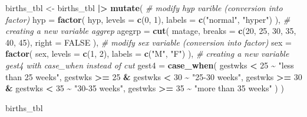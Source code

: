 \documentclass[
]{book}
\newenvironment{Shaded}{\begin{snugshade}}{\end{snugshade}}
\newcommand{\AttributeTok}[1]{\textcolor[rgb]{0.13,0.29,0.53}{#1}}
\newcommand{\CommentTok}[1]{\textcolor[rgb]{0.56,0.35,0.01}{\textit{#1}}}
\newcommand{\ConstantTok}[1]{\textcolor[rgb]{0.56,0.35,0.01}{#1}}
\newcommand{\DecValTok}[1]{\textcolor[rgb]{0.00,0.00,0.81}{#1}}
\newcommand{\FunctionTok}[1]{\textcolor[rgb]{0.13,0.29,0.53}{\textbf{#1}}}
\newcommand{\NormalTok}[1]{#1}
\newcommand{\OtherTok}[1]{\textcolor[rgb]{0.56,0.35,0.01}{#1}}
\newcommand{\SpecialCharTok}[1]{\textcolor[rgb]{0.81,0.36,0.00}{\textbf{#1}}}
\newcommand{\StringTok}[1]{\textcolor[rgb]{0.31,0.60,0.02}{#1}}
\begin{document}
\begin{Shaded}
\begin{Highlighting}[]
\NormalTok{births\_tbl }\OtherTok{\textless{}{-}}
\NormalTok{  births\_tbl }\SpecialCharTok{|\textgreater{}}
  \FunctionTok{mutate}\NormalTok{(}
    \CommentTok{\# modify hyp varible (conversion into factor)}
    \AttributeTok{hyp =} 
      \FunctionTok{factor}\NormalTok{(}
\NormalTok{        hyp, }
        \AttributeTok{levels =} \FunctionTok{c}\NormalTok{(}\DecValTok{0}\NormalTok{, }\DecValTok{1}\NormalTok{), }
        \AttributeTok{labels =} \FunctionTok{c}\NormalTok{(}\StringTok{"normal"}\NormalTok{, }\StringTok{"hyper"}\NormalTok{)}
\NormalTok{      ),}
    \CommentTok{\# creating a new variable aggrep}
    \AttributeTok{agegrp =} 
      \FunctionTok{cut}\NormalTok{(}
\NormalTok{        matage, }
        \AttributeTok{breaks =} \FunctionTok{c}\NormalTok{(}\DecValTok{20}\NormalTok{, }\DecValTok{25}\NormalTok{, }\DecValTok{30}\NormalTok{, }\DecValTok{35}\NormalTok{, }\DecValTok{40}\NormalTok{, }\DecValTok{45}\NormalTok{), }
        \AttributeTok{right =} \ConstantTok{FALSE}
\NormalTok{      ),}
    \CommentTok{\# modify sex variable (conversion into factor)}
    \AttributeTok{sex =} 
      \FunctionTok{factor}\NormalTok{(}
\NormalTok{        sex, }
        \AttributeTok{levels =} \FunctionTok{c}\NormalTok{(}\DecValTok{1}\NormalTok{, }\DecValTok{2}\NormalTok{), }
        \AttributeTok{labels =} \FunctionTok{c}\NormalTok{(}\StringTok{"M"}\NormalTok{, }\StringTok{"F"}\NormalTok{)}
\NormalTok{      ),}
    \CommentTok{\# creating a new variable gest4 with case\_when instead of cut}
    \AttributeTok{gest4 =}
      \FunctionTok{case\_when}\NormalTok{(}
\NormalTok{        gestwks }\SpecialCharTok{\textless{}} \DecValTok{25} \SpecialCharTok{\textasciitilde{}} \StringTok{"less than 25 weeks"}\NormalTok{,}
\NormalTok{        gestwks }\SpecialCharTok{\textgreater{}=} \DecValTok{25} \SpecialCharTok{\&}\NormalTok{ gestwks }\SpecialCharTok{\textless{}} \DecValTok{30} \SpecialCharTok{\textasciitilde{}} \StringTok{"25{-}30 weeks"}\NormalTok{,}
\NormalTok{        gestwks }\SpecialCharTok{\textgreater{}=} \DecValTok{30} \SpecialCharTok{\&}\NormalTok{ gestwks }\SpecialCharTok{\textless{}} \DecValTok{35} \SpecialCharTok{\textasciitilde{}} \StringTok{"30{-}35 weeks"}\NormalTok{,}
\NormalTok{        gestwks }\SpecialCharTok{\textgreater{}=} \DecValTok{35} \SpecialCharTok{\textasciitilde{}} \StringTok{"more than 35 weeks"}
\NormalTok{      )}
\NormalTok{  )}

\NormalTok{births\_tbl}
\end{Highlighting}
\end{Shaded}
\end{document}
